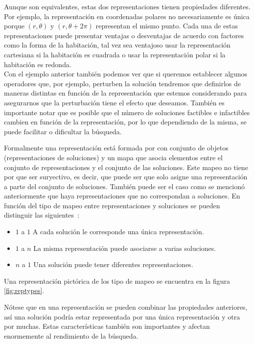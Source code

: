 Aunque son equivalentes, estas dos representaciones tienen propiedades diferentes. Por ejemplo, la representación en coordenadas polares no necesariamente es única porque $(r,\theta)$ y  $(r,\theta+2\pi)$ representan el mismo punto. Cada una de estas representaciones puede presentar ventajas o desventajas de acuerdo con factores como la forma de la habitación, tal vez sea ventajoso usar la representación cartesiana si la habitación es cuadrada o usar la representación polar si la habitación es redonda.\\

Con el ejemplo anterior también podemos ver que si queremos establecer algunos operadores que, por ejemplo, perturben la solución tendremos que definirlos de maneras 
distintas en función de la representación que estemos considerando para asegurarnos que la perturbación tiene el efecto que deseamos.
%
También es importante notar que es posible que el número de soluciones factibles e infactibles cambien en función de la representación, por lo que dependiendo de
la misma, se puede facilitar o dificultar la búsqueda.

Formalmente una representación está formada por con conjunto de objetos (representaciones de soluciones) y un mapa que asocia elementos entre el conjunto de representaciones
y el conjunto de las soluciones. 
%
Este mapeo no tiene por que ser suryectivo, es decir, que puede ser que solo asigne una representación a parte del conjunto de soluciones. 
%
También puede ser el caso como se mencionó anteriormente que haya representaciones que no correspondan a soluciones. 
%
En función del tipo de mapeo entre representaciones y soluciones se pueden distinguir las siguientes~\cite{Cheng1996}: 
\begin{itemize}
    \item $1$ a $1$ A cada solución le corresponde una única representación.
    \item $1$ a $n$ La misma representación puede asociarse a varias soluciones.
    \item $n$ a $1$ Una solución puede tener diferentes representaciones.
\end{itemize}
Una representación pictórica de los tipo de mapeo se encuentra en la figura \ref{fig:reptypes}.

Nótese que en una representación se pueden combinar las propiedades anteriores, así una solución podría estar representada por una única representación
y otra por muchas.
%
Estas características también son importantes y afectan enormemente al rendimiento de la búsqueda.

